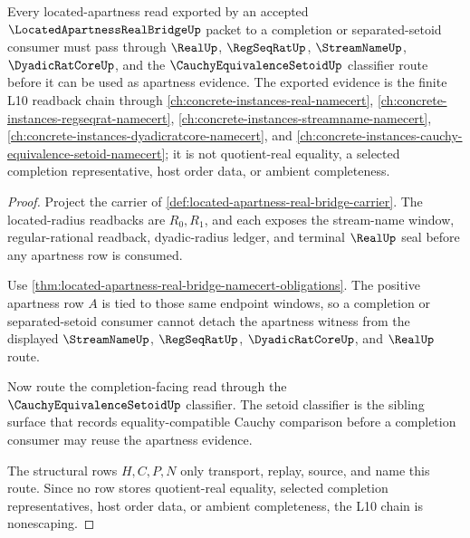 \begin{lemma}
\label{thm:located-apartness-real-bridge-cauchy-setoid-route}
Every located-apartness read exported by an accepted $\LocatedApartnessRealBridgeUp$ packet to a completion or separated-setoid consumer must pass through $\RealUp$, $\RegSeqRatUp$, $\StreamNameUp$, $\DyadicRatCoreUp$, and the $\CauchyEquivalenceSetoidUp$ classifier route before it can be used as apartness evidence. The exported evidence is the finite L10 readback chain through \autoref{ch:concrete-instances-real-namecert}, \autoref{ch:concrete-instances-regseqrat-namecert}, \autoref{ch:concrete-instances-streamname-namecert}, \autoref{ch:concrete-instances-dyadicratcore-namecert}, and \autoref{ch:concrete-instances-cauchy-equivalence-setoid-namecert}; it is not quotient-real equality, a selected completion representative, host order data, or ambient completeness.
\end{lemma}
\begin{proof}
Project the carrier of \autoref{def:located-apartness-real-bridge-carrier}. The located-radius readbacks are $R_0,R_1$, and each exposes the stream-name window, regular-rational readback, dyadic-radius ledger, and terminal $\RealUp$ seal before any apartness row is consumed.

Use \autoref{thm:located-apartness-real-bridge-namecert-obligations}. The positive apartness row $A$ is tied to those same endpoint windows, so a completion or separated-setoid consumer cannot detach the apartness witness from the displayed $\StreamNameUp$, $\RegSeqRatUp$, $\DyadicRatCoreUp$, and $\RealUp$ route.

Now route the completion-facing read through the $\CauchyEquivalenceSetoidUp$ classifier. The setoid classifier is the sibling surface that records equality-compatible Cauchy comparison before a completion consumer may reuse the apartness evidence.

The structural rows $H,C,P,N$ only transport, replay, source, and name this route. Since no row stores quotient-real equality, selected completion representatives, host order data, or ambient completeness, the L10 chain is nonescaping.
\end{proof}
